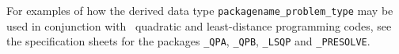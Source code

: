 \documentclass{galahad}
\begin{document}
For examples of how the derived data type
{\tt packagename\_problem\_type} may be used in conjunction with
\galahad\ quadratic and least-distance programming codes,
see the specification sheets
for the packages
{\tt \libraryname\_QPA},
{\tt \libraryname\_QPB},
{\tt \libraryname\_LSQP}
and
{\tt \libraryname\_PRESOLVE}.
\end{document}
